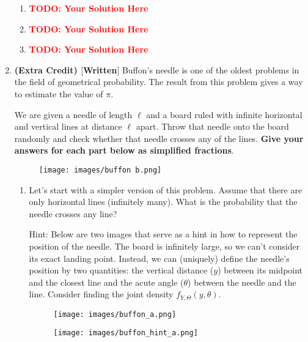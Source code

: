 \documentclass[12pt]{article}
\def\todo#1{\textcolor{red}{\textbf{#1}}}
\renewcommand{\|}{\mid}
\begin{document}
\begin{enumerate}
\begin{tcolorbox}
\begin{enumerate}
\item \todo{TODO: Your Solution Here}
\item \todo{TODO: Your Solution Here}
\item \todo{TODO: Your Solution Here}
\end{enumerate}
\end{tcolorbox}

\pagebreak

\item \textbf{(Extra Credit) $[$Written$]$} Buffon's needle is one of the oldest problems in the field of geometrical probability. The result from this problem gives a way to estimate the value of $\pi$.

We are given a needle of length $\ell$ and a board ruled with infinite horizontal and vertical lines at distance $\ell$ apart. Throw that needle onto the board randomly and check whether that needle crosses any of the lines. \textbf{Give your answers for each part below as simplified fractions}.

\begin{figure}[H]
    \centering
    \texttt{[image: images/buffon b.png]}
\end{figure}

\begin{enumerate}
    \item Let's start with a simpler version of this problem. Assume that there are only horizontal lines (infinitely many). What is the probability that the needle crosses any line? 
    
    Hint: Below are two images that serve as a hint in how to represent the position of the needle. The board is infinitely large, so we can't consider its exact landing point. Instead, we can (uniquely) define the needle's position by two quantities: the vertical distance ($y$) between its midpoint and the closest line and the acute angle ($\theta$) between the needle and the line. Consider finding the joint density $f_{Y, \Theta}(y, \theta)$.
    \begin{figure}[H]
    \centering
    \texttt{[image: images/buffon\_a.png]}
    \end{figure}
    
    \begin{figure}[H]
    \centering
    \texttt{[image: images/buffon\_hint\_a.png]}
    \end{figure}
    

\end{enumerate}
\end{enumerate}
\end{document}
